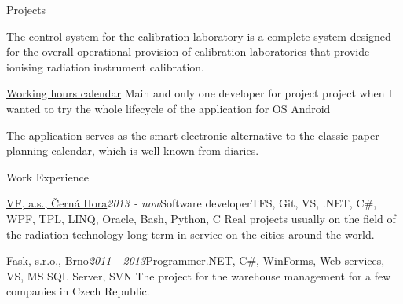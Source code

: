 \documentclass{cv} %
\begin{document}
\begin{rSection}{Projects}
\begin{rSubsection}
The control system for the calibration laboratory is a complete system designed for the overall operational provision of calibration laboratories that provide ionising radiation instrument calibration.
\end{rSubsection}

\begin{rSubsection}
{\href{https://play.google.com/store/apps/details?id=eu.jksoft.planningcalendar}{Working hours calendar}}{}
{Main and only one developer for project project when I wanted to try the whole lifecycle of the application for OS Android}{}

The application serves as the smart electronic alternative to the classic paper planning calendar, which is well known from diaries.
\end{rSubsection}

\end{rSection}


\begin{rSection}{Work Experience}

\begin{rSubsection}{\href{https://www.vfnuclear.com/en/}{VF, a.s., \v Cern\' a Hora}}{\em 2013 - now}{Software developer}{TFS, Git, VS, .NET, C\#, WPF, TPL, LINQ, Oracle, Bash, Python, C}
Real projects usually on the field of the radiation technology long-term in service on the cities around the world.
\end{rSubsection}

\begin{rSubsection}{\href{http://www.fask.cz/}{Fask, s.r.o., Brno}}{\em 2011 - 2013}{Programmer}{.NET, C\#, WinForms, Web services, VS, MS SQL Server, SVN}
The project for the warehouse management for a few companies in Czech Republic.
\end{rSubsection}

\end{rSection}
\end{document}

